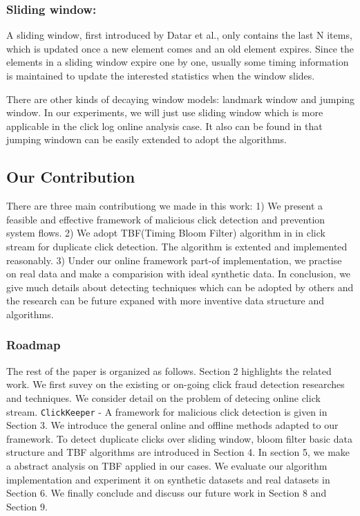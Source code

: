 \documentclass[runningheads,report]{llncs}
\begin{document}
\subsubsection{Sliding window:}
A sliding window, first introduced by Datar et al.\cite{DBLP:conf/soda/DatarGIM02}, only contains the last N items, which is updated once a new element comes and an old element expires. Since the elements in a sliding window expire one by one, usually some timing information is maintained to update the interested statistics when the window slides.

There are other kinds of decaying window models: landmark window and jumping window. In our experiments, we will just use sliding window which is more applicable in the click log online analysis case. It also can be found in \cite{DBLP:conf/icdcs/ZhangG08} that jumping windown can be easily extended to adopt the algorithms.

\subsection{Our Contribution}
There are three main contributiong we made in this work: 1) We present a feasible and effective framework of malicious click detection and prevention system flows. 2) We adopt TBF(Timing Bloom Filter) algorithm in \cite{DBLP:conf/icdcs/ZhangG08} in click stream for duplicate click detection. The algorithm is extented and implemented reasonably. 3) Under our online framework part-of implementation, we practise on real data and make a comparision with ideal synthetic data. In conclusion, we give much details about detecting techniques which can be adopted by others and the research can be future expaned with more inventive data structure and algorithms. 


\subsubsection{Roadmap}

The rest of the paper is organized as follows. Section 2 highlights the related work. We first suvey on the existing or on-going click fraud detection researches and techniques. We consider detail on the problem of detecing online click stream. \texttt{ClickKeeper} - A framework for malicious click detection is given in Section 3. We introduce the general online and offline methods adapted to our framework. To detect duplicate clicks over sliding window, bloom filter basic data structure and TBF algorithms are introduced in Section 4. In section 5, we make a abstract analysis on TBF applied in our cases. We evaluate our algorithm implementation and experiment it on synthetic datasets and real datasets in Section 6. We finally conclude and discuss our future work in Section 8 and Section 9.
\end{document}
